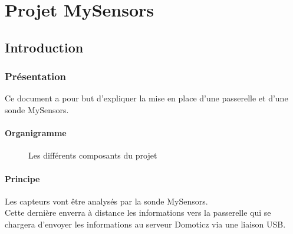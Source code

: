 \part{Projet MySensors}

\chapter{Introduction}

\section{Présentation}

Ce document a pour but d'expliquer la mise en place d'une passerelle et d'une sonde MySensors.

\subsection{Organigramme}

\begin{figure}[h]
  \centering
{} 
\caption{Les différents composants du projet}
\end{figure}

  \subsection{Principe}

  Les capteurs vont être analysés par la sonde MySensors.\\
  Cette dernière enverra à distance les informations vers la passerelle qui se chargera d'envoyer les informations au serveur Domoticz via une liaison USB.\\


